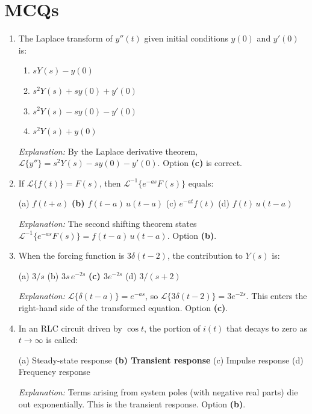 \documentclass[12pt,a4paper]{article}
\begin{document}
\section{MCQs}

\begin{enumerate}

\item The Laplace transform of $y''(t)$ given initial conditions $y(0)$ and $y'(0)$ is:
\begin{enumerate}[label=(\alph*)]
  \item $sY(s) - y(0)$
  \item $s^2Y(s) + sy(0) + y'(0)$
  \item \textbf{$s^2Y(s) - sy(0) - y'(0)$}
  \item $s^2Y(s) + y(0)$
\end{enumerate}
\textit{Explanation:} By the Laplace derivative theorem, $\mathcal{L}\{y''\} = s^2Y(s) - sy(0) - y'(0)$. Option \textbf{(c)} is correct.

\item If $\mathcal{L}\{f(t)\} = F(s)$, then $\mathcal{L}^{-1}\{e^{-as}F(s)\}$ equals:

(a) $f(t+a)$ \quad
\textbf{(b) $f(t-a)\,u(t-a)$} \quad
(c) $e^{-at}f(t)$ \quad
(d) $f(t)\,u(t-a)$

\textit{Explanation:} The second shifting theorem states
$\mathcal{L}^{-1}\{e^{-as}F(s)\} = f(t-a)\,u(t-a)$. Option \textbf{(b)}.

\item When the forcing function is $3\delta(t-2)$, the contribution to $Y(s)$ is:

(a) $3/s$ \quad
(b) $3s\,e^{-2s}$ \quad
\textbf{(c) $3e^{-2s}$} \quad
(d) $3/(s+2)$

\textit{Explanation:} $\mathcal{L}\{\delta(t-a)\} = e^{-as}$, so $\mathcal{L}\{3\delta(t-2)\} = 3e^{-2s}$.
This enters the right-hand side of the transformed equation. Option \textbf{(c)}.

\item In an RLC circuit driven by $\cos t$, the portion of $i(t)$ that decays to zero as
$t\to\infty$ is called:

(a) Steady-state response \quad
\textbf{(b) Transient response} \quad
(c) Impulse response \quad
(d) Frequency response

\textit{Explanation:} Terms arising from system poles (with negative real parts) die out
exponentially. This is the transient response. Option \textbf{(b)}.


\end{enumerate}
\end{document}

